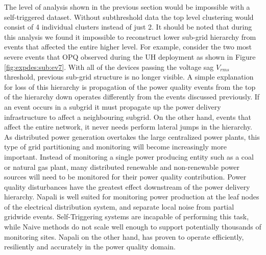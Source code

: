 The level of analysis shown in the previous section would be impossible with a self-triggered dataset.
Without subthreshold data the top level clustering would consist of 4 individual clusters instead of just 2.
It should be noted that during this analysis we found it impossible to reconstruct lower sub-grid  hierarchy from events that affected the entire higher level.
For example, consider the two most severe events that OPQ observed during the UH deployment as shown in Figure \ref{fig:expdes:sub:ev7}.
With all of the devices passing the voltage sag $V_{rms}$ threshold, previous sub-grid structure is no longer visible.
A simple explanation for loss of this hierarchy is  propagation of the power quality events from the top of the hierarchy down operates differently from the events discussed previously.
If an event occurs in a subgrid it must propagate up the power delivery infrastructure to affect a neighbouring subgrid.
On the other hand, events that affect the entire network, it never needs perform lateral jumps in the hierarchy.
As distributed power generation overtakes the large centralized power plants, this type of grid partitioning and monitoring will become increasingly more important.
Instead of monitoring a single power producing entity such as a coal or natural gas plant, many distributed renewable and non-renewable power sources will need to be monitored for their power quality contribution.
Power quality disturbances have the greatest effect downstream of the power delivery hierarchy.
Napali is well suited for monitoring power production at the leaf nodes of the electrical distribution system, and separate local noise from partial gridwide events.
Self-Triggering systems are incapable of performing this task, while Naive methods do not scale well enough to support potentially thousands of monitoring sites.
Napali on the other hand, has proven to operate efficiently, resiliently and accurately in the power quality domain.
